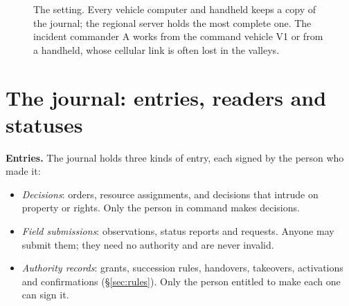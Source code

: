 \documentclass[11pt,a4paper]{article}
\begin{document}
\begin{figure}[htbp]
\caption{The setting. Every vehicle computer and handheld keeps a copy of the journal; the
regional server holds the most complete one. The incident commander A works from the
command vehicle V1 or from a handheld, whose cellular link is often lost in the valleys.}
\label{fig:setting}
\end{figure}

\section{The journal: entries, readers and statuses}
\label{sec:journal}

\textbf{Entries.} The journal holds three kinds of entry, each signed by the person who
made it:
\begin{itemize}
  \item \textit{Decisions}: orders, resource assignments, and decisions that intrude on
        property or rights. Only the person in command makes decisions.
  \item \textit{Field submissions}: observations, status reports and requests. Anyone may
        submit them; they need no authority and are never invalid.
  \item \textit{Authority records}: grants, succession rules, handovers, takeovers,
        activations and confirmations (\S\ref{sec:rules}). Only the person entitled to make
        each one can sign it.
\end{itemize}
\end{document}
